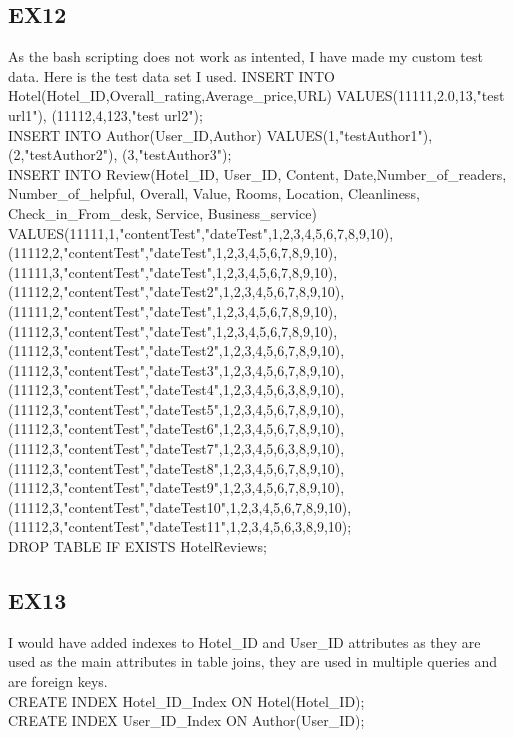 \documentclass{article}
\begin{document}
	\subsection{EX12}
	As the bash scripting does not work as intented, I have made my custom test data.
	Here is the test data set I used.
	INSERT INTO Hotel(Hotel\_ID,Overall\_rating,Average\_price,URL)
	VALUES(11111,2.0,13,"test url1"),
	(11112,4,123,"test url2");
	\\
	INSERT INTO Author(User\_ID,Author)
	VALUES(1,"testAuthor1"),
	(2,"testAuthor2"),
	(3,"testAuthor3");
	\\
	INSERT INTO Review(Hotel\_ID, User\_ID, Content, Date,Number\_of\_readers, Number\_of\_helpful, Overall, Value, Rooms, Location, Cleanliness, Check\_in\_From\_desk, Service, Business\_service)
	VALUES(11111,1,"contentTest","dateTest",1,2,3,4,5,6,7,8,9,10),
	(11112,2,"contentTest","dateTest",1,2,3,4,5,6,7,8,9,10),
	(11111,3,"contentTest","dateTest",1,2,3,4,5,6,7,8,9,10),
	(11112,2,"contentTest","dateTest2",1,2,3,4,5,6,7,8,9,10),
	(11111,2,"contentTest","dateTest",1,2,3,4,5,6,7,8,9,10),
	(11112,3,"contentTest","dateTest",1,2,3,4,5,6,7,8,9,10),
	(11112,3,"contentTest","dateTest2",1,2,3,4,5,6,7,8,9,10),
	(11112,3,"contentTest","dateTest3",1,2,3,4,5,6,7,8,9,10),
	(11112,3,"contentTest","dateTest4",1,2,3,4,5,6,3,8,9,10),
	(11112,3,"contentTest","dateTest5",1,2,3,4,5,6,7,8,9,10),
	(11112,3,"contentTest","dateTest6",1,2,3,4,5,6,7,8,9,10),
	(11112,3,"contentTest","dateTest7",1,2,3,4,5,6,3,8,9,10),
	(11112,3,"contentTest","dateTest8",1,2,3,4,5,6,7,8,9,10),
	(11112,3,"contentTest","dateTest9",1,2,3,4,5,6,7,8,9,10),
	(11112,3,"contentTest","dateTest10",1,2,3,4,5,6,7,8,9,10),
	(11112,3,"contentTest","dateTest11",1,2,3,4,5,6,3,8,9,10);
	\\
	DROP TABLE IF EXISTS HotelReviews;
	
	
	\subsection{EX13}
	I would have added indexes to Hotel\_ID and User\_ID attributes as they are used as the main attributes in table joins, they are used in multiple queries and are foreign keys. \\
	CREATE INDEX Hotel\_ID\_Index ON Hotel(Hotel\_ID); \\
	CREATE INDEX User\_ID\_Index ON Author(User\_ID);
	
\end{document}
